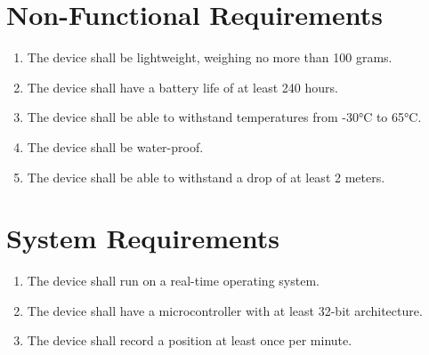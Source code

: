 \documentclass[a4paper,11pt]{article}
\begin{document}
\newpage

\section{Non-Functional Requirements}
\begin{enumerate}[label=\textbf{NFR\arabic*},itemindent=2em]
	\item The device shall be lightweight, weighing no more than 100 grams.
	\item The device shall have a battery life of at least 240 hours.
	\item The device shall be able to withstand temperatures from -30°C to 65°C.
	\item The device shall be water-proof.
	\item The device shall be able to withstand a drop of at least 2 meters.
\end{enumerate}

\newpage

\section{System Requirements}
\begin{enumerate}[label=\textbf{SR\arabic*},itemindent=1em]
	\item The device shall run on a real-time operating system.
	\item The device shall have a microcontroller with at least 32-bit architecture.
	\item The device shall record a position at least once per minute.
\end{enumerate}
\end{document}
